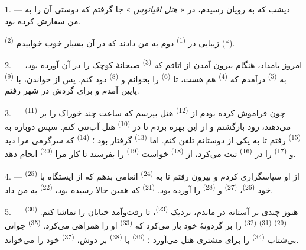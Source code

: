 \textit{}

\VUsaut{3.0mm}
\VUsaut{1.6mm}
\VUsaut{2.0mm}
\VUsaut{3.4mm}

1. --- دیشب که به رویان رسیدم، در « \textit{هتل اقیانوس} » جا گرفتم که
دوستی آن را به من سفارش کرده بود.

 \textsuperscript{(2)} زیبایی در 
\textsuperscript{(1)} دوم به من دادند که در آن بسیار خوب خوابیدم (*).

2. --- امروز بامداد، هنگام بیرون آمدن از اتاقم که 
\textsuperscript{(3)} صبحانهٔ کوچک را در آن آورده بود، به  \textsuperscript{(5)} درآمدم که 
\textsuperscript{(4)} هم هست، تا 
\textsuperscript{(6)} را بخوانم و  \textsuperscript{(8)}
دود کنم. پس از خواندن، با  \textsuperscript{(9)} پایین
آمدم و برای گردش در شهر رفتم.

3. --- چون فراموش کرده بودم از  \textsuperscript{(12)}
هتل بپرسم که ساعت چند خوراک را بر 
\textsuperscript{(11)} می‌دهند، زود بازگشتم و از این بهره بردم تا در
 \textsuperscript{(10)} هتل آب‌تنی کنم. سپس دوباره به
 \textsuperscript{(15)} رفتم تا به یکی از دوستانم تلفن
کنم. اما  \textsuperscript{(13)} گرفتار بود ؛
 \textsuperscript{(14)} که سرگرمی مرا دید و
 \textsuperscript{(17)} را در 
\textsuperscript{(16)} ثبت می‌کرد، از 
\textsuperscript{(18)} خواست  \textsuperscript{(19)} را
بفرستد تا کار مرا  \textsuperscript{(20)} انجام دهد.

4. --- از او سپاسگزاری کردم و بیرون رفتم تا به 
\textsuperscript{(24)} انعامی بدهم که از ایستگاه با 
\textsuperscript{(25)} خود  \textsuperscript{(26)}،
 \textsuperscript{(27)} و 
\textsuperscript{(28)} را آورده بود. 
\textsuperscript{(21)} که همین حالا رسیده بود، 
\textsuperscript{(22)} به من داد.

5. --- هنوز چندی بر آستانهٔ در ماندم، نزدیک 
\textsuperscript{(23)}، تا رفت‌وآمد خیابان را تماشا کنم.
 \textsuperscript{(30)} 
\textsuperscript{(29)}  \textsuperscript{(31)}
 \textsuperscript{(32)} را بر گردونهٔ خود بار می‌کرد که
 \textsuperscript{(33)} او را همراهی می‌کرد.
 \textsuperscript{(35)} جوانی بی‌شتاب
 \textsuperscript{(34)} را برای مشتری هتل می‌آورد ؛
 \textsuperscript{(36)} با 
\textsuperscript{(38)} بر دوش، 
\textsuperscript{(37)} خود را می‌خواند.

